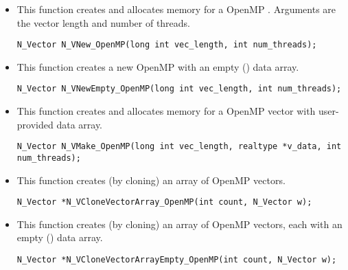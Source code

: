 \begin{itemize}


\item {}

  This function creates and allocates memory for a OpenMP .
  Arguments are the vector length and number of threads.

  \verb|N_Vector N_VNew_OpenMP(long int vec_length, int num_threads);|


\item {}

  This function creates a new OpenMP  with an empty () data array.

  

  \verb|N_Vector N_VNewEmpty_OpenMP(long int vec_length, int num_threads);|


\item {}

 This function creates and allocates memory for a OpenMP vector
 with user-provided data array.

 

 \verb|N_Vector N_VMake_OpenMP(long int vec_length, realtype *v_data, int num_threads);|


\item {}

 This function creates (by cloning) an array of  OpenMP vectors.

 

 \verb|N_Vector *N_VCloneVectorArray_OpenMP(int count, N_Vector w);|


\item {}

 This function creates (by cloning) an array of  OpenMP vectors, each with an
 empty () data array.

 

 \verb|N_Vector *N_VCloneVectorArrayEmpty_OpenMP(int count, N_Vector w);|



\end{itemize}

